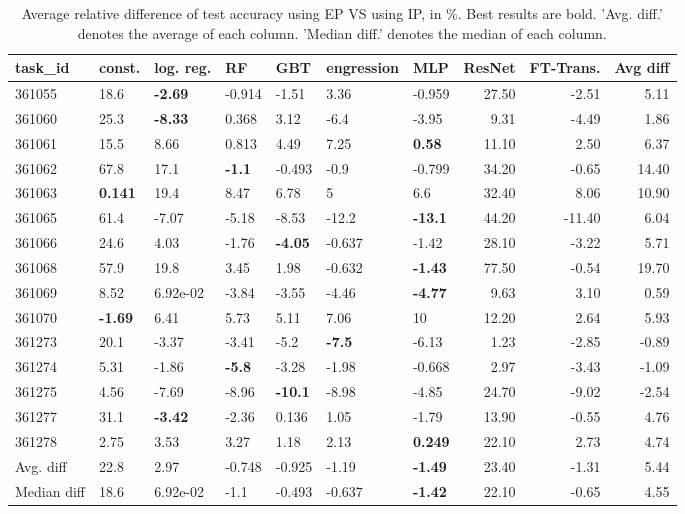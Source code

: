 \begin{table}[ht!]
\centering
\begingroup\footnotesize
\begin{tabular}{lllllllrrr}
  \hline
\hline
task\_id & const. & log. reg. & RF & GBT & engression & MLP & ResNet & FT-Trans. & Avg diff \\ 
  \hline
361055 & 18.6 & \textbf{-2.69} & -0.914 & -1.51 & 3.36 & -0.959 & 27.50 & -2.51 & 5.11 \\ 
  361060 & 25.3 & \textbf{-8.33} & 0.368 & 3.12 & -6.4 & -3.95 & 9.31 & -4.49 & 1.86 \\ 
  361061 & 15.5 & 8.66 & 0.813 & 4.49 & 7.25 & \textbf{0.58} & 11.10 & 2.50 & 6.37 \\ 
  361062 & 67.8 & 17.1 & \textbf{-1.1} & -0.493 & -0.9 & -0.799 & 34.20 & -0.65 & 14.40 \\ 
  361063 & \textbf{0.141} & 19.4 & 8.47 & 6.78 & 5 & 6.6 & 32.40 & 8.06 & 10.90 \\ 
  361065 & 61.4 & -7.07 & -5.18 & -8.53 & -12.2 & \textbf{-13.1} & 44.20 & -11.40 & 6.04 \\ 
  361066 & 24.6 & 4.03 & -1.76 & \textbf{-4.05} & -0.637 & -1.42 & 28.10 & -3.22 & 5.71 \\ 
  361068 & 57.9 & 19.8 & 3.45 & 1.98 & -0.632 & \textbf{-1.43} & 77.50 & -0.54 & 19.70 \\ 
  361069 & 8.52 & 6.92e-02 & -3.84 & -3.55 & -4.46 & \textbf{-4.77} & 9.63 & 3.10 & 0.59 \\ 
  361070 & \textbf{-1.69} & 6.41 & 5.73 & 5.11 & 7.06 & 10 & 12.20 & 2.64 & 5.93 \\ 
  361273 & 20.1 & -3.37 & -3.41 & -5.2 & \textbf{-7.5} & -6.13 & 1.23 & -2.85 & -0.89 \\ 
  361274 & 5.31 & -1.86 & \textbf{-5.8} & -3.28 & -1.98 & -0.668 & 2.97 & -3.43 & -1.09 \\ 
  361275 & 4.56 & -7.69 & -8.96 & \textbf{-10.1} & -8.98 & -4.85 & 24.70 & -9.02 & -2.54 \\ 
  361277 & 31.1 & \textbf{-3.42} & -2.36 & 0.136 & 1.05 & -1.79 & 13.90 & -0.55 & 4.76 \\ 
  361278 & 2.75 & 3.53 & 3.27 & 1.18 & 2.13 & \textbf{0.249} & 22.10 & 2.73 & 4.74 \\ 
   \hline
Avg. diff & 22.8 & 2.97 & -0.748 & -0.925 & -1.19 & \textbf{-1.49} & 23.40 & -1.31 & 5.44 \\ 
  Median diff & 18.6 & 6.92e-02 & -1.1 & -0.493 & -0.637 & \textbf{-1.42} & 22.10 & -0.65 & 4.55 \\ 
   \hline
\hline
\end{tabular}
\endgroup
\caption{Average relative difference of test accuracy using EP VS using IP, in \%. 
                  Best results are bold. 
                  'Avg. diff.' denotes the average of each column.
                  'Median diff.' denotes the median of each column.} 
\label{TABLES/table_results_accuracy_clustering_only_num_features_EP_VS_IP}
\end{table}
